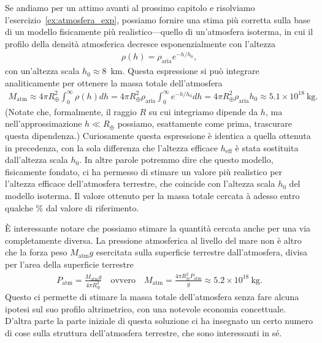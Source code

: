 \begin{solution}
Se andiamo per un attimo avanti al prossimo capitolo e risolviamo
l'esercizio~\ref{ex:atmosfera_exp}, possiamo fornire una stima pi\`u corretta
sulla base di un modello fisicamente pi\`u realistico---quello di un'atmosfera
isoterma, in cui il profilo della densit\`a atmosferica decresce esponenzialmente
con l'altezza
\begin{align*}
  \rho(h) = \rho_\text{aria} e^{-h/h_0},
\end{align*}
con un'altezza scala $h_0 \approx 8$~km. Questa espressione si pu\`o integrare
analiticamente per ottenere la massa totale dell'atmosfera
\begin{align}
  M_\text{atm} \approx 4 \pi R_\oplus^2 \int_0^\infty \rho(h) dh =
  4 \pi R_\oplus^2 \rho_\text{aria} \int_0^\infty e^{-h/h_0} dh =
  4 \pi R_\oplus^2 \rho_\text{aria} h_0 \approx 5.1 \times 10^{18}~\text{kg}.
\end{align}
(Notate che, formalmente, il raggio $R$ su cui integriamo dipende da $h$, ma
nell'approssimazione $h \ll R_\oplus$ possiamo, esattamente come prima, trascurare
questa dipendenza.) Curiosamente questa espressione \`e identica a quella
ottenuta in precedenza, con la sola differenza che l'altezza efficace $h_\text{eff}$
\`e stata sostituita dall'altezza scala $h_0$. In altre parole potremmo dire
che questo modello, fisicamente fondato, ci ha permesso di stimare un valore
pi\`u realistico per l'altezza efficace dell'atmosfera terrestre, che coincide
con l'altezza scala $h_0$ del modello isoterma. Il valore ottenuto per la massa
totale cercata \`a adesso entro qualche \% dal valore di riferimento.

\`E interessante notare che possiamo stimare la quantità cercata anche per una
via completamente diversa. La pressione atmosferica al livello del mare non \`e
altro che la forza peso $M_\text{atm} g$ esercitata sulla superficie terrestre
dall'atmosfera, divisa per l'area della superficie terrestre
\begin{align}
  P_\text{atm} = \frac{M_\text{atm} g}{4 \pi R_\oplus^2}
  \quad\text{ovvero}\quad
  M_\text{atm} = \frac{4 \pi R_\oplus^2 P_\text{atm}}{g} \approx
  5.2 \times 10^{18}~\text{kg}.
\end{align}
Questo ci permette di stimare la massa totale dell'atmosfera senza fare alcuna
ipotesi sul suo profilo altrimetrico, con una notevole economia concettuale.
D'altra parte la parte iniziale di questa soluzione ci ha insegnato un certo
numero di cose sulla struttura dell'atmosfera terrestre, che sono interessanti
in s\'e.

\end{solution}



